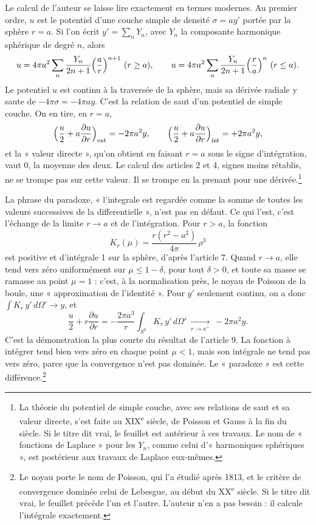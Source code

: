 \documentclass[11pt,a4paper]{article}
\begin{document}
Le calcul de l'auteur se laisse lire exactement en termes modernes. Au
premier ordre, \(u\) est le potentiel d'une couche simple de densité
\(\sigma=ay'\) portée par la sphère \(r=a\). Si l'on écrit
\(y'=\sum_nY_n\), avec \(Y_n\) la composante harmonique sphérique de degré
\(n\), alors
\[
u=4\pi a^2\sum_{n}\frac{Y_n}{2n+1}\Bigl(\frac ar\Bigr)^{n+1}\ (r\ge a),\qquad
u=4\pi a^2\sum_{n}\frac{Y_n}{2n+1}\Bigl(\frac ra\Bigr)^{n}\ (r\le a).
\]
Le potentiel \(u\) est continu à la traversée de la sphère, mais sa dérivée
radiale y saute de \(-4\pi\sigma=-4\pi ay\). C'est la relation de saut d'un
potentiel de simple couche. On en tire, en \(r=a\),
\[
\Bigl(\frac u2+a\frac{\partial u}{\partial r}\Bigr)_{\text{ext}}=-2\pi a^2y,\qquad
\Bigl(\frac u2+a\frac{\partial u}{\partial r}\Bigr)_{\text{int}}=+2\pi a^2y,
\]
et la « valeur directe », qu'on obtient en faisant \(r=a\) sous le signe
d'intégration, vaut \(0\), la moyenne des deux. Le calcul des articles 2 et 4,
signes moins rétablis, ne se trompe pas sur cette valeur. Il se trompe en la
prenant pour une dérivée.\footnote{La théorie du potentiel de simple couche,
avec ses relations de saut et sa valeur directe, s'est faite au
XIX\textsuperscript{e} siècle, de Poisson et Gauss à la fin du siècle. Si le
titre dit vrai, le feuillet est antérieur à ces travaux. Le nom de
« fonctions de Laplace » pour les \(Y_n\), comme celui d'« harmoniques
sphériques », est postérieur aux travaux de Laplace eux-mêmes.}

La phrase du paradoxe, « l'integrale est regardée comme la somme de toutes les
valeurs successives de la differentielle », n'est pas en défaut. Ce qui l'est,
c'est l'échange de la limite \(r\to a\) et de l'intégration. Pour \(r>a\), la
fonction
\[
K_r(\mu)=\frac{r(r^2-a^2)}{4\pi}\,\rho^3
\]
est positive et d'intégrale 1 sur la sphère, d'après l'article 7. Quand
\(r\to a\), elle tend vers zéro uniformément sur \(\mu\le1-\delta\), pour tout
\(\delta>0\), et toute sa masse se ramasse au point \(\mu=1\) : c'est, à la
normalisation près, le noyau de Poisson de la boule, une « approximation de
l'identité ». Pour \(y'\) seulement continu, on a donc
\(\int K_r\,y'\,d\Omega'\to y\), et
\[
\frac u2+r\frac{\partial u}{\partial r}=-\frac{2\pi a^3}{r}\int_{S^2}K_r\,y'\,d\Omega'
\ \xrightarrow[r\to a^+]{}\ -2\pi a^2y .
\]
C'est la démonstration la plus courte du résultat de l'article 9. La
fonction à intégrer tend bien vers zéro en chaque point \(\mu<1\), mais son
intégrale ne tend pas vers zéro, parce que la convergence n'est pas dominée.
Le « paradoxe » est cette différence.\footnote{Le noyau porte le nom de
Poisson, qui l'a étudié après 1813, et le critère de convergence dominée celui
de Lebesgue, au début du XX\textsuperscript{e} siècle. Si le titre dit vrai,
le feuillet précède l'un et l'autre. L'auteur n'en a pas besoin : il calcule
l'intégrale exactement.}
\end{document}
